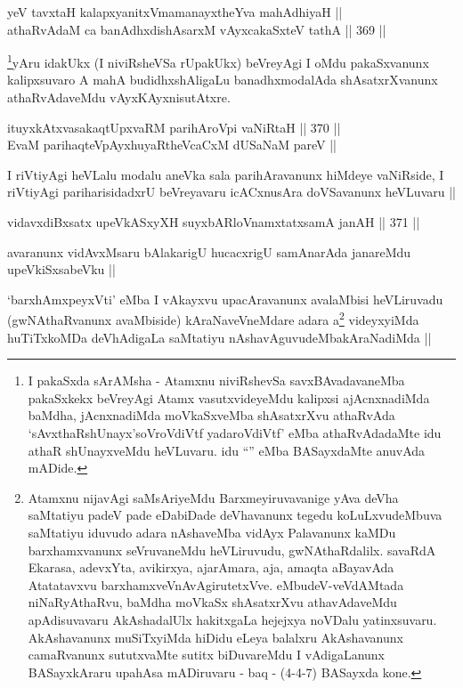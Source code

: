 
\begin{shl}
yeV tavxtaH kalapxyanitxVmamanayxtheYva mahAdhiyaH || \\
athaRvAdaM ca banAdhxdishAsarxM vAyxcakaSxteV tathA ||  369 ||  
\end{shl}

\begin{artha}
\footnote{I pakaSxda sArAMsha - Atamxnu niviRshevSa savxBAvadavaneMba
  pakaSxkekx beVreyAgi Atamx vasutxvideyeMdu kalipxsi ajAcnxnadiMda
  baMdha, jAcnxnadiMda moVkaSxveMba shAsatxrXvu athaRvAda
  `sAvxthaRshUnayx'soV\s roVdiVtf yadaroVdiVtf' eMba athaRvAdadaMte
  idu athaR shUnayxveMdu heVLuvaru. idu ``\stext'' eMba BASayxdaMte
  anuvAda mADide.}yAru idakUkx (I niviRsheVSa rUpakUkx) beVreyAgi I oMdu
pakaSxvanunx kalipxsuvaro A mahA budidhxshAligaLu banadhxmodalAda
shAsatxrXvanunx athaRvAdaveMdu vAyxKAyxnisutAtxre.
\end{artha}

\begin{shl}
ituyxkAtxvasakaqtUpxvaRM parihAroV\s pi vaNiRtaH ||  370 ||  \\
EvaM parihaqteV\s pAyxhuyaRtheVcaCxM dUSaNaM pareV ||
\end{shl}

\begin{artha}
I riVtiyAgi heVLalu modalu aneVka sala parihAravanunx hiMdeye
vaNiRside, I riVtiyAgi pariharisidadxrU beVreyavaru icACxnusAra
doVSavanunx heVLuvaru ||
\end{artha}

\begin{shl}
vidavxdiBxsatx upeVkASxyXH suyxbARloVnamxtatxsamA janAH ||  371 ||  
\end{shl}

\begin{artha}
avaranunx vidAvxMsaru bAlakarigU hucacxrigU samAnarAda janareMdu
upeVkiSxsabeVku ||
\end{artha}


\begin{artha}
`barxhAmxpeyxVti' eMba I vAkayxvu upacAravanunx avalaMbisi heVLiruvadu
  (gwNAthaRvanunx avaMbiside) kAraNaveVneMdare adara
  a\footnote{Atamxnu nijavAgi saMsAriyeMdu Barxmeyiruvavanige yAva
    deVha saMtatiyu padeV pade eDabiDade deVhavanunx tegedu
    koLuLxvudeMbuva saMtatiyu iduvudo adara nAshaveMba vidAyx
    Palavanunx kaMDu barxhamxvanunx seVruvaneMdu heVLiruvudu,
    gwNAthaRdalilx. savaRdA Ekarasa, adevxYta, avikirxya, ajarAmara,
    aja, amaqta aBayavAda Atatatavxvu
    barxhamxveVnAvAgirutetxVve. eMbudeV-veVdAMtada niNaRyAthaRvu,
    baMdha moVkaSx shAsatxrXvu athavAdaveMdu apAdisuvavaru
    AkAshadalUlx hakitxgaLa hejejxya noVDalu
    yatinxsuvaru. AkAshavanunx muSiTxyiMda hiDidu eLeya balalxru
    AkAshavanunx camaRvanunx sututxvaMte sutitx biDuvareMdu I
    vAdigaLanunx BASayxkAraru upahAsa mADiruvaru - baq - (4-4-7)
    BASayxda kone.} videyxyiMda huTiTxkoMDa deVhAdigaLa saMtatiyu
  nAshavAguvudeMbakAraNadiMda ||
\end{artha}
